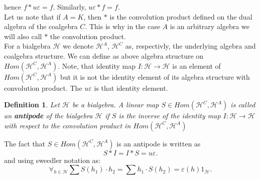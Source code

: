 \documentclass[a4paper]{article}
\newtheorem{definition}{Definition}
\begin{document}
hence $f * u\varepsilon = f$. Similarly, $u\varepsilon * f = f$. \\
Let us note that if $A = K$, then $*$ is the convolution product defined on the dual algebra of the coalgebra
$C$. This is why in the case $A$ is an arbitrary algebra we will also call $*$ the convolution product.
\\[8pt]
\indent For a bialgebra $\mathcal{H}$ we denote $\mathcal{H}^A$, $\mathcal{H}^C$ as, respectivly,
the underlying algebra and coalgebra structure. We can define as above algebra structure on
$Hom(\mathcal{H}^C, \mathcal{H}^A)$. Note, that identity map $I : \mathcal{H} \to \mathcal{H}$ is an
element of $Hom(\mathcal{H}^C, \mathcal{H}^A)$ but it is not the identity element of its algebra structure
with convolution product. The $u\varepsilon$ is that identity element.
\begin{definition}
Let $\mathcal{H}$ be a bialgebra. A linear map $S \in Hom(\mathcal{H}^C, \mathcal{H}^A)$ is called an 
\textbf{antipode} of the bialgebra $\mathcal{H}$ if $S$ is the inverse of the identity map 
$I : \mathcal{H} \to \mathcal{H}$ with respect to the convolution product in 
$Hom(\mathcal{H}^C, \mathcal{H}^A)$
\end{definition}
The fact that $S \in Hom(\mathcal{H}^C, \mathcal{H}^A)$ is an antipode is written as
\begin{equation*}
S * I = I * S = u\varepsilon.
\end{equation*}
and using sweedler notation as:
\begin{equation*}
\forall_{h \in \mathcal{H}} \sum S(h_1) \cdot h_2 = \sum h_1 \cdot S(h_2) = \varepsilon(h)1_\mathcal{H}.
\end{equation*}
\end{document}
